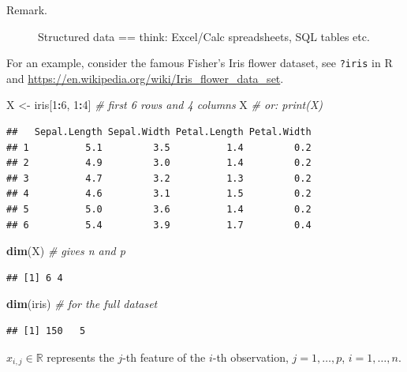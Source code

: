 \documentclass[10pt,b5paper,krantz1]{krantz}
\newenvironment{Shaded}{\begin{snugshade}}{\end{snugshade}}
\newcommand{\CommentTok}[1]{\textcolor[rgb]{0.37,0.37,0.37}{\textit{#1}}}
\newcommand{\DecValTok}[1]{\textcolor[rgb]{0.06,0.06,0.06}{#1}}
\newcommand{\KeywordTok}[1]{\textcolor[rgb]{0.27,0.27,0.27}{\textbf{#1}}}
\newcommand{\NormalTok}[1]{#1}
\newcommand{\OperatorTok}[1]{\textcolor[rgb]{0.43,0.43,0.43}{\textbf{#1}}}
\newcommand{\StringTok}[1]{\textcolor[rgb]{0.5,0.5,0.5}{#1}}
\begin{document}
\begin{description}
\item[Remark.]
Structured data == think: Excel/Calc spreadsheets, SQL tables etc.
\end{description}

For an example, consider the famous Fisher's Iris flower dataset,
see \texttt{?iris} in R
and \url{https://en.wikipedia.org/wiki/Iris_flower_data_set}.

\begin{Shaded}
\begin{Highlighting}[]
\NormalTok{X <-}\StringTok{ }\NormalTok{iris[}\DecValTok{1}\OperatorTok{:}\DecValTok{6}\NormalTok{, }\DecValTok{1}\OperatorTok{:}\DecValTok{4}\NormalTok{] }\CommentTok{# first 6 rows and 4 columns}
\NormalTok{X         }\CommentTok{# or: print(X)}
\end{Highlighting}
\end{Shaded}

\begin{verbatim}
##   Sepal.Length Sepal.Width Petal.Length Petal.Width
## 1          5.1         3.5          1.4         0.2
## 2          4.9         3.0          1.4         0.2
## 3          4.7         3.2          1.3         0.2
## 4          4.6         3.1          1.5         0.2
## 5          5.0         3.6          1.4         0.2
## 6          5.4         3.9          1.7         0.4
\end{verbatim}

\begin{Shaded}
\begin{Highlighting}[]
\KeywordTok{dim}\NormalTok{(X)    }\CommentTok{# gives n and p}
\end{Highlighting}
\end{Shaded}

\begin{verbatim}
## [1] 6 4
\end{verbatim}

\begin{Shaded}
\begin{Highlighting}[]
\KeywordTok{dim}\NormalTok{(iris) }\CommentTok{# for the full dataset}
\end{Highlighting}
\end{Shaded}

\begin{verbatim}
## [1] 150   5
\end{verbatim}

\(x_{i,j}\in\mathbb{R}\)
represents the \(j\)-th feature of the \(i\)-th observation,
\(j=1,\dots,p\), \(i=1,\dots,n\).
\end{document}
